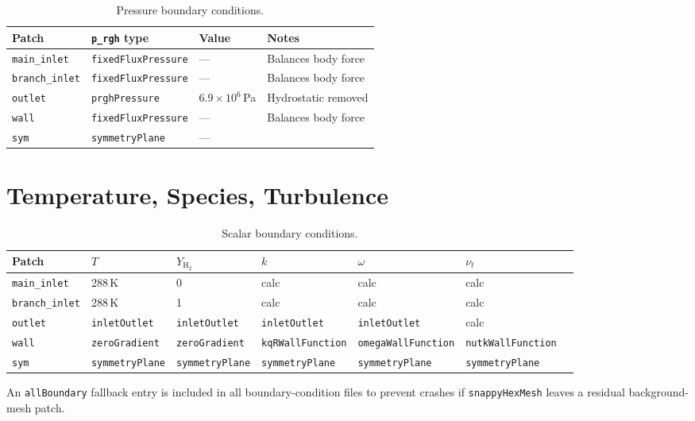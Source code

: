 \documentclass[12pt,a4paper]{report}
\begin{document}
\begin{table}[H]
\centering
\caption{Pressure boundary conditions.}
\begin{tabularx}{\textwidth}{@{}lllX@{}}
\toprule
\textbf{Patch} & \textbf{\texttt{p\_rgh} type} & \textbf{Value} & \textbf{Notes} \\
\midrule
\texttt{main\_inlet}   & \texttt{fixedFluxPressure} & --- & Balances body force \\
\texttt{branch\_inlet}  & \texttt{fixedFluxPressure} & --- & Balances body force \\
\texttt{outlet}         & \texttt{prghPressure} & $6.9 \times 10^6$\,Pa & Hydrostatic removed \\
\texttt{wall}           & \texttt{fixedFluxPressure} & --- & Balances body force \\
\texttt{sym}            & \texttt{symmetryPlane} & --- & \\
\bottomrule
\end{tabularx}
\end{table}


\section{Temperature, Species, Turbulence}

\begin{table}[H]
\centering
\caption{Scalar boundary conditions.}
\small
\begin{tabularx}{\textwidth}{@{}lllllll@{}}
\toprule
\textbf{Patch} & $T$ & $Y_{\mathrm{H_2}}$ & $k$ & $\omega$ & $\nu_t$ \\
\midrule
\texttt{main\_inlet}   & 288\,K & 0 & calc & calc & calc \\
\texttt{branch\_inlet}  & 288\,K & 1 & calc & calc & calc \\
\texttt{outlet}         & \texttt{inletOutlet} & \texttt{inletOutlet} & \texttt{inletOutlet} & \texttt{inletOutlet} & calc \\
\texttt{wall}           & \texttt{zeroGradient} & \texttt{zeroGradient} & \texttt{kqRWallFunction} & \texttt{omegaWallFunction} & \texttt{nutkWallFunction} \\
\texttt{sym}            & \texttt{symmetryPlane} & \texttt{symmetryPlane} & \texttt{symmetryPlane} & \texttt{symmetryPlane} & \texttt{symmetryPlane} \\
\bottomrule
\end{tabularx}
\end{table}

\noindent An \texttt{allBoundary} fallback entry is included in all
boundary-condition files to prevent crashes if \texttt{snappyHexMesh}
leaves a residual background-mesh patch.
\end{document}
